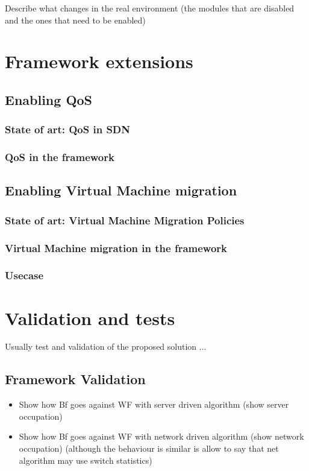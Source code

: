 \documentclass[12pt,english]{book}
\begin{document}
Describe what changes in the real environment (the modules that are disabled and the ones that need to be enabled)

\chapter{Framework extensions \label{cha:} }

\section{Enabling QoS}
\subsection{State of art: QoS in SDN}
\subsection{QoS in the framework}
\newpage

\section{Enabling Virtual Machine migration}
\subsection{State of art: Virtual Machine Migration Policies}
\subsection{Virtual Machine migration in the framework}
\subsection{Usecase}

\chapter{Validation and tests \label{cha:valtes} }

Usually test and validation of the proposed solution ...

\section{Framework Validation}

\begin{itemize}
	\item Show how Bf goes against WF with server driven algorithm (show server occupation)
	\item Show how Bf goes against WF with network driven algorithm (show network occupation) (although the behaviour is similar is allow to say that net algorithm may use switch statistics)
\end{itemize}
\newpage
\end{document}
